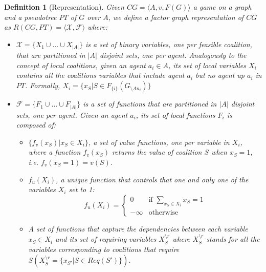 \documentclass[11pt, twoside, titlepage, a4paper, openright]{report}
\newtheorem{Def}{Definition}
\begin{document}
\begin{Def}[Representation]\label{def:representation}
Given $CG=\langle A, v, F(G)\rangle$ a game on a graph and a pseudotree $PT$ of $G$ over $A$, we define a factor graph representation of $CG$ as $R(CG,PT)=\langle\mathcal{X},\mathcal{F}\rangle$ where:
\begin{itemize}
\item $\mathcal{X}=\{X_1\cup\ldots\cup X_{|A|}\}$ is a set of binary variables, one per feasible coalition, that are partitioned in $|A|$ disjoint sets, one per agent. Analogously to the concept of local coalitions, given an agent $a_i \in A$, its set of local variables $X_i$ contains all the coalitions variables that include agent $a_i$ but no agent up $a_i$ in $PT$. Formally, $X_i=\{x_S|S\in F_{\{i\}} (G_{\setminus An_i})\}$
\item $\mathcal{F}=\{F_1\cup\ldots\cup F_{|A|}\}$ is a set of functions that are partitioned in $|A|$ disjoint sets, one per agent. Given an agent $a_i$, its set of local functions $F_i$ is composed of:
\begin{itemize}
\item $\{f_v(x_S)|x_S\in X_i\}$, a set of value functions, one per variable in $X_i$, where a function $f_v(x_S)$ returns the value of
coalition $S$ when $x_S = 1$, \textit{i.e.} $f_v(x_S=1)=v(S)$.
\item $f_u(X_i)$, a \textit{unique function} that controls that one and only one of the variables $X_i$ set to 1:
\begin{equation}\label{eq:unifun}
f_u(X_i)=\begin{cases}0 & \mbox{if } \sum_{x_S\in X_i}x_S=1 \\-\infty &\mbox{otherwise}\end{cases}
\end{equation}
\item A set of functions that capture the dependencies between each variable $x_S \in X_i$ and its set of requiring variables $X^{\setminus r}_S$ where $X^{\setminus r}_S$ stands for all the variables corresponding to coalitions that require $S(X^{\setminus r}_S = \{x_{S'}|S\in Req(S')\})$. 


\end{itemize}
\end{itemize}
\end{Def}
\end{document}

